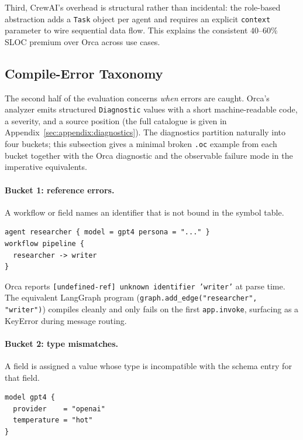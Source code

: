 \documentclass[sigconf,nonacm]{acmart}
\begin{document}
Third, CrewAI's overhead is structural rather than incidental: the
role-based abstraction adds a \texttt{Task} object per agent and requires
an explicit \texttt{context} parameter to wire sequential data flow.
This explains the consistent $40$--$60\%$ SLOC premium over Orca across
use cases.

\subsection{Compile-Error Taxonomy}
\label{sec:evaluation:taxonomy}

The second half of the evaluation concerns \emph{when} errors are caught.
Orca's analyzer emits structured \texttt{Diagnostic} values with a short
machine-readable code, a severity, and a source position (the full
catalogue is given in Appendix~\ref{sec:appendix:diagnostics}). The
diagnostics partition naturally into four buckets; this subsection gives a
minimal broken \texttt{.oc} example from each bucket together with the
Orca diagnostic and the observable failure mode in the imperative
equivalents.

\paragraph{Bucket 1: reference errors.} A workflow or field names an
identifier that is not bound in the symbol table.

\begin{lstlisting}[caption={Reference error: \texttt{writer} is never declared.},label={lst:err-ref}]
agent researcher { model = gpt4 persona = "..." }
workflow pipeline {
  researcher -> writer
}
\end{lstlisting}

\noindent Orca reports \texttt{[undefined-ref] unknown identifier 'writer'}
at parse time. The equivalent LangGraph program
(\texttt{graph.add\_edge("researcher", "writer")}) compiles cleanly and
only fails on the first \texttt{app.invoke}, surfacing as a KeyError
during message routing.

\paragraph{Bucket 2: type mismatches.} A field is assigned a value whose
type is incompatible with the schema entry for that field.

\begin{lstlisting}[caption={Type mismatch: \texttt{temperature} requires \texttt{float}.},label={lst:err-type}]
model gpt4 {
  provider    = "openai"
  temperature = "hot"
}
\end{lstlisting}
\end{document}
